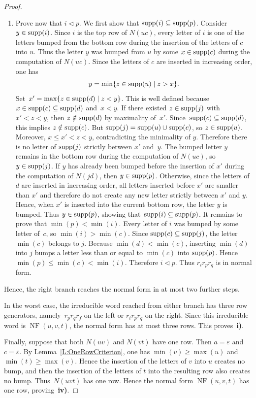 \documentclass[a4paper, twoside, 11pt, english]{article}
\begin{document}
\begin{proof}
\begin{enumerate}[\bf A)]
\begin{enumerate}[\bf a)]
\item Prove now that $i\triangleleft p$.
We first show that $\operatorname{supp}(i)\subseteq\operatorname{supp}(p)$.
Consider $y\in\operatorname{supp}(i)$.
Since $i$ is the top row of $N(uc)$, every letter of $i$ is one of the
letters bumped from the bottom row during the insertion of the letters of
$c$ into $u$. Thus the letter $y$ was bumped from $u$ by some
$x\in\operatorname{supp}(c)$ during the computation of $N(uc)$. Since the letters of
$c$ are inserted in increasing order, one has
\[
y=\min\{z\in\operatorname{supp}(u)\mid z>x\}.
\]
Set~$x'=\max\{z\in\operatorname{supp}(d)\mid z<y\}$.
This is well defined because $x\in\operatorname{supp}(c)\subseteq\operatorname{supp}(d)$ and~$x<y$.
If there existed $z\in\operatorname{supp}(j)$ with $x'<z<y$, then $z\notin\operatorname{supp}(d)$ by
maximality of~$x'$. Since~$\operatorname{supp}(c)\subseteq\operatorname{supp}(d)$, this implies
$z\notin\operatorname{supp}(c)$. But $\operatorname{supp}(j)=\operatorname{supp}(u)\cup\operatorname{supp}(c)$, so
$z\in\operatorname{supp}(u)$. Moreover, $x\le x'<z<y$, contradicting the minimality of
$y$. Therefore there is no letter of $\operatorname{supp}(j)$ strictly between $x'$ and~$y$.
The bumped letter $y$ remains in the bottom row during the computation of
$N(uc)$, so $y\in\operatorname{supp}(j)$. If $y$ has already been bumped before the
insertion of $x'$ during the computation of $N(jd)$, then
$y\in\operatorname{supp}(p)$. Otherwise, since the letters of $d$ are inserted in
increasing order, all letters inserted before $x'$ are smaller than $x'$ and
therefore do not create any new letter strictly between $x'$ and $y$.
Hence, when $x'$ is inserted into the current bottom row, the letter $y$ is
bumped. Thus $y\in\operatorname{supp}(p)$, showing that~$\operatorname{supp}(i)\subseteq\operatorname{supp}(p)$.
It remains to prove that $\min(p)<\min(i)$.
Every letter of $i$ was bumped by some letter of~$c$, so
$\min(i)>\min(c)$. Since $\operatorname{supp}(c)\subseteq\operatorname{supp}(j)$, the letter $\min(c)$
belongs to $j$. Because $\min(d)<\min(c)$, inserting $\min(d)$ into $j$
bumps a letter less than or equal to $\min(c)$ into $\operatorname{supp}(p)$. Hence~$\min(p)\le\min(c)<\min(i)$.
Therefore $i\triangleleft p$.
Thus $r_i r_p r_q$ is in normal form.
\end{enumerate}
\end{enumerate}


Hence, the right branch reaches the normal form in at most two further steps.

In the worst case, the irreducible word reached from either branch has three
row generators, namely~$r_p r_q r_f$ on the left or $r_i r_p r_q$ on the
right. Since this irreducible word is $\operatorname{NF}(u,v,t)$, the normal
form has at most three rows. This proves~{\bf i)}.

Finally, suppose that both $N(uv)$ and $N(vt)$ have one row. Then
$a=\varepsilon$ and $c=\varepsilon$. By Lemma~\ref{L:OneRowCriterion}, one has
$\min(v)\ge\max(u)$ and $\min(t)\ge\max(v)$. Hence the insertion of the letters
of $v$ into $u$ creates no bump, and then the insertion of the letters of $t$
into the resulting row also creates no bump. Thus~$N(uvt)$ has one row. Hence
the normal form $\operatorname{NF}(u,v,t)$ has one row, proving~{\bf iv)}.
\end{proof}
\end{document}
